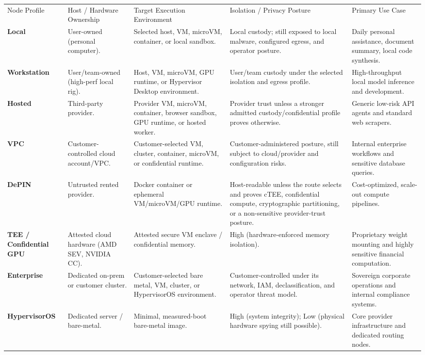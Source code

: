\documentclass[
  11pt,
]{article}
\begin{document}
\begin{longtable}[]{@{}
  >{\raggedright\arraybackslash}p{}
  >{\raggedright\arraybackslash}p{}
  >{\raggedright\arraybackslash}p{}
  >{\raggedright\arraybackslash}p{}
  >{\raggedright\arraybackslash}p{}@{}}
\toprule\noalign{}
& & & & \\
\midrule\noalign{}
\endhead
\bottomrule\noalign{}
\endlastfoot
Node Profile & Host / Hardware Ownership & Target Execution Environment
& Isolation / Privacy Posture & Primary Use Case \\
\textbf{Local} & User-owned (personal computer). & Selected host, VM, microVM,
container, or local sandbox. & Local custody; still exposed to local malware,
configured egress, and operator posture. & Daily
personal assistance, document summary, local code synthesis. \\
\textbf{Workstation} & User/team-owned (high-perf local rig). & Host, VM,
microVM, GPU runtime, or Hypervisor Desktop environment. & User/team custody
under the selected isolation and egress profile.
& High-throughput local model inference and development. \\
\textbf{Hosted} & Third-party provider. & Provider VM, microVM, container,
browser sandbox, GPU runtime, or hosted worker. & Provider trust unless a
stronger admitted custody/confidential profile proves otherwise.
& Generic low-risk API agents and standard web scrapers. \\
\textbf{VPC} & Customer-controlled cloud account/VPC. & Customer-selected VM,
cluster, container, microVM, or confidential runtime. & Customer-administered
posture, still subject to cloud/provider and configuration risks.
& Internal enterprise workflows and sensitive database queries. \\
\textbf{DePIN} & Untrusted rented provider. & Docker container or
ephemeral VM/microVM/GPU runtime. & Host-readable unless the route selects and
proves cTEE, confidential compute, cryptographic partitioning, or a
non-sensitive provider-trust posture. &
Cost-optimized, scale-out compute pipelines. \\
\textbf{TEE / Confidential GPU} & Attested cloud hardware (AMD SEV,
NVIDIA CC). & Attested secure VM enclave / confidential memory. & High
(hardware-enforced memory isolation). & Proprietary weight mounting and
highly sensitive financial computation. \\
\textbf{Enterprise} & Dedicated on-prem or customer cluster. & Customer-selected
bare metal, VM, cluster, or HypervisorOS environment. & Customer-controlled
under its network, IAM, declassification, and operator threat model. &
Sovereign corporate operations and internal compliance
systems. \\
\textbf{HypervisorOS} & Dedicated server / bare-metal. & Minimal,
measured-boot bare-metal image. & High (system integrity); Low (physical
hardware spying still possible). & Core provider infrastructure and
dedicated routing nodes. \\
\end{longtable}
\end{document}
